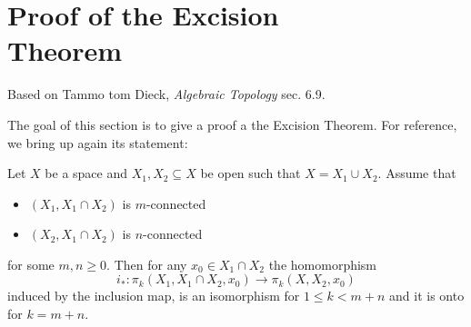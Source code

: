 

\chapter[Proof of the Excision Theorem]{Proof of the Excision \\ Theorem}
\label{PROOF EXCISION CHAPTER}
\thispagestyle{firststyle}


Based on Tammo tom Dieck, \emph{Algebraic Topology} sec. 6.9. 

The goal of this section is to give a proof a the Excision Theorem. For reference, 
we bring up again its statement:

{
\renewcommand{\thetheorem}{\ref{HOMOTOPY  EXCISION THM}}
\begin{HOMOTEXCISIONTHM}
Let $X$ be a space and
$X_{1}, X_{2}\subseteq X$ be open such that 
$X=  X_{1}\cup X_{2}$. Assume that 
\begin{itemize}
\item $(X_{1}, X_{1}\cap X_{2})$ is $m$-connected 
\item $(X_{2}, X_{1}\cap X_{2})$ is $n$-connected 
\end{itemize}
for some $m, n \geq 0$. Then for any $x_{0}\in X_{1}\cap X_{2}$ the homomorphism 
\[
i_{\ast}\colon \pi_{k}(X_{1}, X_{1}\cap X_{2}, x_{0}) \to \pi_{k}(X, X_{2}, x_{0})
\]
induced by  the inclusion map, is an isomorphism for $1 \leq k < m+n$ and 
it is onto for $k = m+n$.
\end{HOMOTEXCISIONTHM}
\addtocounter{theorem}{-1}
}

